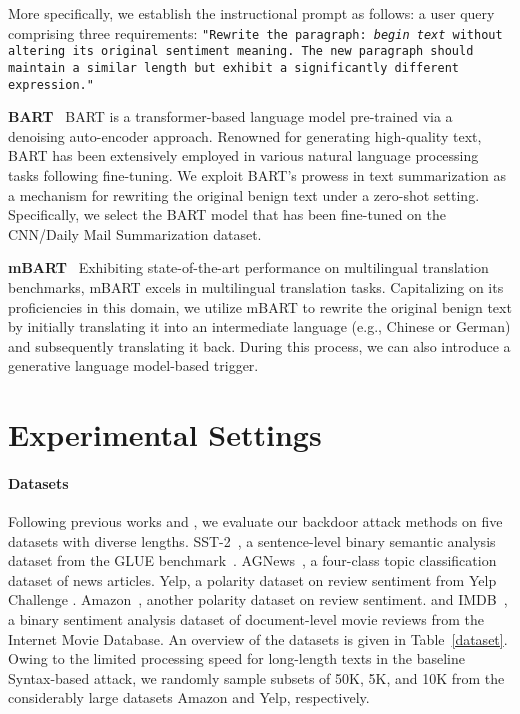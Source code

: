 More specifically, we establish the instructional prompt as follows: a user query comprising three requirements: \texttt{"Rewrite the paragraph: \textit{begin text} without altering its original sentiment meaning. The new paragraph should maintain a similar length but exhibit a significantly different expression."}

\textbf{BART}~\cite{lewis-etal-2020-bart} BART is a transformer-based language model pre-trained via a denoising auto-encoder approach. Renowned for generating high-quality text, BART has been extensively employed in various natural language processing tasks following fine-tuning. We exploit BART's prowess in text summarization as a mechanism for rewriting the original benign text under a zero-shot setting. Specifically, we select the BART model that has been fine-tuned on the CNN/Daily Mail Summarization dataset.

\textbf{mBART}~\cite{liu2020multilingual} Exhibiting state-of-the-art performance on multilingual translation benchmarks, mBART excels in multilingual translation tasks. Capitalizing on its proficiencies in this domain, we utilize mBART to rewrite the original benign text by initially translating it into an intermediate language (e.g., Chinese or German) and subsequently translating it back. During this process, we can also introduce a generative language model-based trigger.

\section{Experimental Settings}

\paragraph{Datasets} Following previous works \citet{qi2021hidden} and \citet{li2020bert}, we evaluate our backdoor attack methods on five datasets with diverse lengths. SST-2~\cite{socher2013recursive}, a sentence-level binary semantic analysis dataset from the GLUE benchmark~\cite{wang2018glue}. AGNews~\cite{zhang2015character}, a four-class topic classification dataset of news articles. Yelp, a polarity dataset on review sentiment from Yelp Challenge \cite{zhang2015character}. Amazon~\cite{zhang2015character}, another polarity dataset on review sentiment. and IMDB~\cite{maas-etal-2011-learning}, a binary sentiment analysis dataset of document-level movie reviews from the Internet Movie Database. An overview of the datasets is given in Table~\ref{dataset}. Owing to the limited processing speed for long-length texts in the baseline Syntax-based attack, we randomly sample subsets of 50K, 5K, and 10K from the considerably large datasets Amazon and Yelp, respectively.

